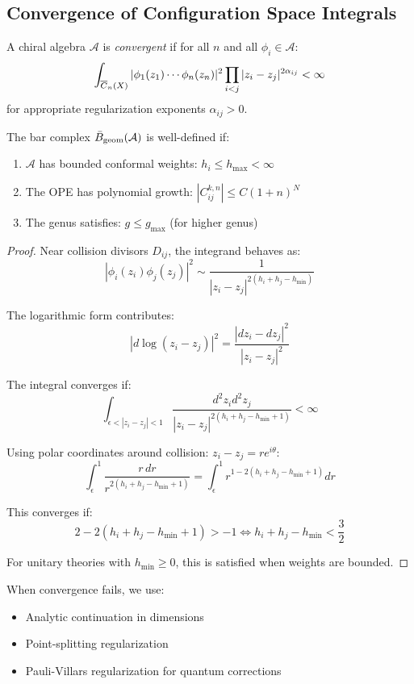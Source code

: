 \subsection{Convergence of Configuration Space Integrals}

\begin{definition}
A chiral algebra $\mathcal{A}$ is \emph{convergent} if for all $n$ and all $\phi_i \in \mathcal{A}$:
$$\int_{\overline{C}_{n}(X)} |\phi_1(z_1) \cdots \phi_n(z_n)|^2 \prod_{i<j} |z_i - z_j|^{2\alpha_{ij}} < \infty$$
for appropriate regularization exponents $\alpha_{ij} > 0$.
\end{definition}

\begin{theorem}
The bar complex $\bar{B}_{\text{geom}}(\mathcal{A})$ is well-defined if:
\begin{enumerate}
\item $\mathcal{A}$ has bounded conformal weights: $h_i \leq h_{\max} < \infty$
\item The OPE has polynomial growth: $|C_{ij}^{k,n}| \leq C(1 + n)^N$
\item The genus satisfies: $g \leq g_{\max}$ (for higher genus)
\end{enumerate}
\end{theorem}

\begin{proof}
Near collision divisors $D_{ij}$, the integrand behaves as:
$$|\phi_i(z_i)\phi_j(z_j)|^2 \sim \frac{1}{|z_i - z_j|^{2(h_i + h_j - h_{\min})}}$$

The logarithmic form contributes:
$$|d\log(z_i - z_j)|^2 = \frac{|dz_i - dz_j|^2}{|z_i - z_j|^2}$$

The integral converges if:
$$\int_{\epsilon < |z_i - z_j| < 1} \frac{d^2z_i d^2z_j}{|z_i - z_j|^{2(h_i + h_j - h_{\min} + 1)}} < \infty$$

Using polar coordinates around collision: $z_i - z_j = re^{i\theta}$:
$$\int_\epsilon^1 \frac{r \, dr}{r^{2(h_i + h_j - h_{\min} + 1)}} = \int_\epsilon^1 r^{1 - 2(h_i + h_j - h_{\min} + 1)} dr$$

This converges if:
$$2 - 2(h_i + h_j - h_{\min} + 1) > -1 \iff h_i + h_j - h_{\min} < \frac{3}{2}$$

For unitary theories with $h_{\min} \geq 0$, this is satisfied when weights are bounded.
\end{proof}

\begin{remark}[Regularization]
When convergence fails, we use:
\begin{itemize}
\item Analytic continuation in dimensions
\item Point-splitting regularization
\item Pauli-Villars regularization for quantum corrections
\end{itemize}
\end{remark}

